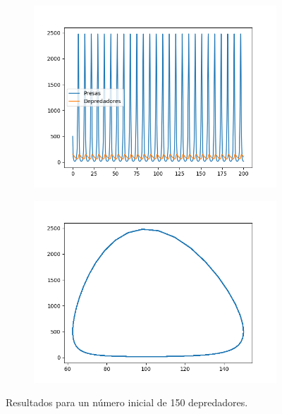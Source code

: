 \documentclass[11pt,a4paper]{article}
\begin{document}
\begin{figure}[H]
\centering
\begin{subfigure}{.5\textwidth}
	\centering
	\includegraphics[scale=0.45]{img/x500y150}
	\label{fig:y150}
\end{subfigure}%
\begin{subfigure}{.5\textwidth}
	\centering
	\includegraphics[scale=0.45]{img/circulo-y150}
	\label{fig:circ-y150}
\end{subfigure}
\caption{Resultados para un número inicial de 150 depredadores.}
\end{figure}
\end{document}
